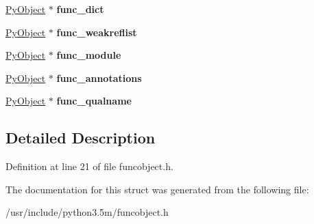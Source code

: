 \begin{DoxyCompactItemize}
\item 
\hyperlink{struct__object}{Py\+Object} $\ast$ {\bfseries func\+\_\+dict}\hypertarget{structPyFunctionObject_a291b33faa7d01907b1ddbc07e4f37409}{}\label{structPyFunctionObject_a291b33faa7d01907b1ddbc07e4f37409}

\item 
\hyperlink{struct__object}{Py\+Object} $\ast$ {\bfseries func\+\_\+weakreflist}\hypertarget{structPyFunctionObject_abef9b746762125a815e52b8c6754f36e}{}\label{structPyFunctionObject_abef9b746762125a815e52b8c6754f36e}

\item 
\hyperlink{struct__object}{Py\+Object} $\ast$ {\bfseries func\+\_\+module}\hypertarget{structPyFunctionObject_a77f851f25b514b4a7d902eeba5f3b681}{}\label{structPyFunctionObject_a77f851f25b514b4a7d902eeba5f3b681}

\item 
\hyperlink{struct__object}{Py\+Object} $\ast$ {\bfseries func\+\_\+annotations}\hypertarget{structPyFunctionObject_a715b0fe3ce91d9f9705d08b1e9910023}{}\label{structPyFunctionObject_a715b0fe3ce91d9f9705d08b1e9910023}

\item 
\hyperlink{struct__object}{Py\+Object} $\ast$ {\bfseries func\+\_\+qualname}\hypertarget{structPyFunctionObject_af3a9b62f81d731aaeac0af99635b1b72}{}\label{structPyFunctionObject_af3a9b62f81d731aaeac0af99635b1b72}

\end{DoxyCompactItemize}


\subsection{Detailed Description}


Definition at line 21 of file funcobject.\+h.



The documentation for this struct was generated from the following file\+:\begin{DoxyCompactItemize}
\item 
/usr/include/python3.\+5m/funcobject.\+h\end{DoxyCompactItemize}
